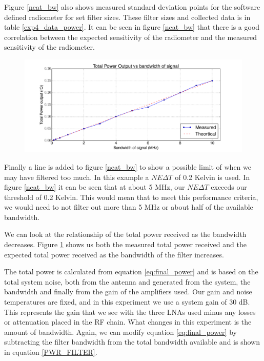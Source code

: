 {Figure \ref{neat_bw} also shows measured standard deviation points for the software defined radiometer for set filter sizes.  These filter sizes and collected data is in table \ref{exp4_data_power}.  It can be seen in figure \ref{neat_bw} that there is a good correlation between the expected sensitivity of the radiometer and the measured sensitivity of the radiometer.

\begin{figure}[h!tb] \centering
\includegraphics[width=\textwidth]{Experiments/Exp5/combined_plot.pdf}
\label{power_bw}
\end{figure}

Finally a line is added to figure \ref{neat_bw} to show a possible limit of when we may have filtered too much.  In this example a $NE\Delta T$ of 0.2 Kelvin is used.  In figure \ref{neat_bw} it can be seen that at about 5 MHz, our $NE\Delta T$ exceeds our threshold of 0.2 Kelvin.  This would mean that to meet this performance criteria, we would need to not filter out more than 5 MHz or about half of the available bandwidth.  

We can look at the relationship of the total power received as the bandwidth decreases.  Figure \ref{power_bw} shows us both the measured total power received and the expected total power received as the bandwidth of the filter increases.

The total power is calculated from equation \ref{eq:final_power} and is based on the total system noise, both from the antenna and generated from the system, the bandwidth and finally from the gain of the amplifiers used.  Our gain and noise temperatures are fixed, and in this experiment we use a system gain of 30 dB.  This represents the gain that we see with the three LNAs used minus any losses or attenuation placed in the RF chain.  What changes in this experiment is the amount of bandwidth.  Again, we can modify equation \ref{eq:final_power} by subtracting the filter bandwidth from the total bandwidth available and is shown in equation \ref{PWR_FILTER}.

}
